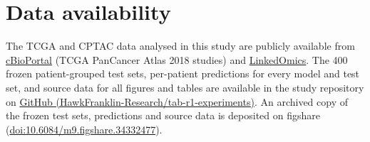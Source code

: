 \section*{Data availability}
The TCGA and CPTAC data analysed in this study are publicly available from \href{https://www.cbioportal.org}{cBioPortal} (TCGA PanCancer Atlas 2018 studies) and \href{https://www.linkedomics.org}{LinkedOmics}. The 400 frozen patient-grouped test sets, per-patient predictions for every model and test set, and source data for all figures and tables are available in the study repository on \href{https://github.com/HawkFranklin-Research/tab-r1-experiments}{GitHub (HawkFranklin-Research/tab-r1-experiments)}. An archived copy of the frozen test sets, predictions and source data is deposited on figshare (\href{https://doi.org/10.6084/m9.figshare.34332477}{doi:10.6084/m9.figshare.34332477}).
